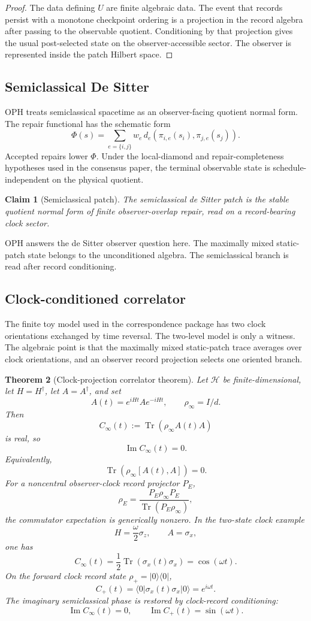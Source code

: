 \documentclass[11pt]{article}
\newtheorem{theorem}{Theorem}[section]
\newtheorem{claim}[theorem]{Claim}
\theoremstyle{remark}
\theoremstyle{plain}
\newcommand{\Tr}{\operatorname{Tr}}
\newcommand{\im}{\operatorname{Im}}
\begin{document}
\begin{proof}
The data defining \(U\) are finite algebraic data. The event that records persist with a
monotone checkpoint ordering is a projection in the record algebra after passing to the
observable quotient. Conditioning by that projection gives the usual post-selected state on the
observer-accessible sector. The observer is represented inside the patch Hilbert space.
\end{proof}

\subsection{Semiclassical De Sitter}

OPH treats semiclassical spacetime as an observer-facing quotient normal form. The repair
functional has the schematic form
\[
\Phi(s)=\sum_{e=\{i,j\}} w_e\,
d_e\!\left(\pi_{i,e}(s_i),\pi_{j,e}(s_j)\right).
\]
Accepted repairs lower \(\Phi\). Under the local-diamond and repair-completeness hypotheses used
in the consensus paper, the terminal observable state is schedule-independent on the physical
quotient.

\begin{claim}[Semiclassical patch]
The semiclassical de Sitter patch is the stable quotient normal form of finite
observer-overlap repair, read on a record-bearing clock sector.
\end{claim}

OPH answers the de Sitter observer question here. The maximally mixed
static-patch state belongs to the unconditioned algebra. The semiclassical branch is read after
record conditioning.

\subsection{Clock-conditioned correlator}

The finite toy model used in the correspondence package has two clock orientations exchanged by
time reversal. The two-level model is only a witness. The algebraic point is that the maximally
mixed static-patch trace averages over clock orientations, and an observer record projection selects
one oriented branch.

\begin{theorem}[Clock-projection correlator theorem]
Let \(\mathcal H\) be finite-dimensional, let \(H=H^\dagger\), let \(A=A^\dagger\), and set
\[
A(t)=e^{iHt}Ae^{-iHt},\qquad \rho_\infty=I/d.
\]
Then
\[
C_\infty(t):=\Tr(\rho_\infty A(t)A)
\]
is real, so
\[
\im C_\infty(t)=0.
\]
Equivalently,
\[
\Tr(\rho_\infty[A(t),A])=0.
\]
For a noncentral observer-clock record projector \(P_E\),
\[
\rho_E=\frac{P_E\rho_\infty P_E}{\Tr(P_E\rho_\infty)},
\]
the commutator expectation is generically nonzero. In the two-state clock example
\[
H=\frac{\omega}{2}\sigma_z,\qquad A=\sigma_x,
\]
one has
\[
C_\infty(t)=\frac12\Tr(\sigma_x(t)\sigma_x)=\cos(\omega t).
\]
On the forward clock record state \(\rho_+=|0\rangle\langle0|\),
\[
C_+(t)=\langle0|\sigma_x(t)\sigma_x|0\rangle=e^{i\omega t}.
\]
The imaginary semiclassical phase is restored by clock-record conditioning:
\[
\im C_\infty(t)=0,\qquad \im C_+(t)=\sin(\omega t).
\]
\end{theorem}
\end{document}
